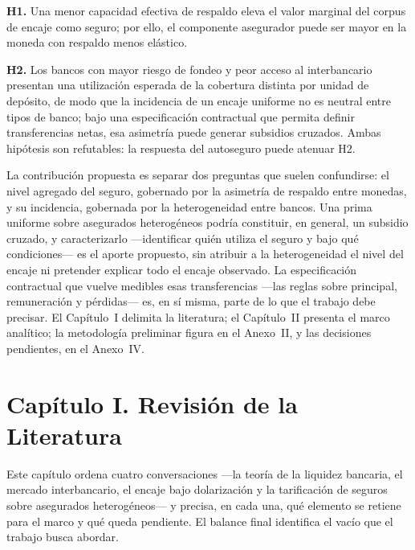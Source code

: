\documentclass[11pt,a4paper]{article}
\begin{document}
\noindent\textbf{H1.} Una menor capacidad efectiva de respaldo eleva el valor marginal del corpus de encaje como seguro; por ello, el componente asegurador puede ser mayor en la moneda con respaldo menos elástico.

\noindent\textbf{H2.} Los bancos con mayor riesgo de fondeo y peor acceso al interbancario presentan una utilización esperada de la cobertura distinta por unidad de depósito, de modo que la incidencia de un encaje uniforme no es neutral entre tipos de banco; bajo una especificación contractual que permita definir transferencias netas, esa asimetría puede generar subsidios cruzados. Ambas hipótesis son refutables: la respuesta del autoseguro puede atenuar H2.

La contribución propuesta es separar dos preguntas que suelen confundirse: el nivel agregado del seguro, gobernado por la asimetría de respaldo entre monedas, y su incidencia, gobernada por la heterogeneidad entre bancos. Una prima uniforme sobre asegurados heterogéneos podría constituir, en general, un subsidio cruzado, y caracterizarlo ---identificar quién utiliza el seguro y bajo qué condiciones--- es el aporte propuesto, sin atribuir a la heterogeneidad el nivel del encaje ni pretender explicar todo el encaje observado. La especificación contractual que vuelve medibles esas transferencias ---las reglas sobre principal, remuneración y pérdidas--- es, en sí misma, parte de lo que el trabajo debe precisar. El Capítulo~I delimita la literatura; el Capítulo~II presenta el marco analítico; la metodología preliminar figura en el Anexo~II, y las decisiones pendientes, en el Anexo~IV.

\clearpage
\section{Capítulo I. Revisión de la Literatura}\label{sec:lit}

Este capítulo ordena cuatro conversaciones ---la teoría de la liquidez bancaria, el mercado interbancario, el encaje bajo dolarización y la tarificación de seguros sobre asegurados heterogéneos--- y precisa, en cada una, qué elemento se retiene para el marco y qué queda pendiente. El balance final identifica el vacío que el trabajo busca abordar.
\end{document}
